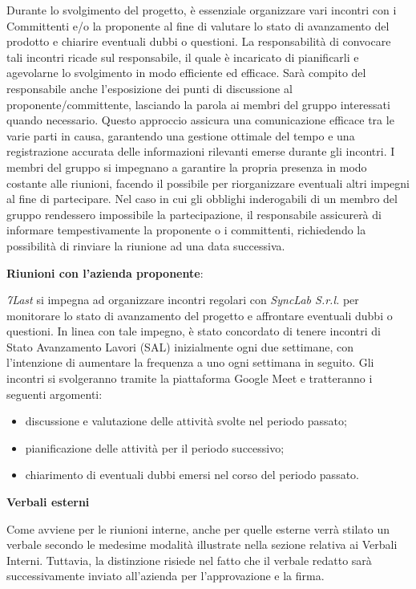 Durante lo svolgimento del progetto, è essenziale organizzare vari incontri con i Committenti e/o la proponente al fine di valutare lo stato di avanzamento del prodotto e chiarire eventuali dubbi o questioni.
La responsabilità di convocare tali incontri ricade sul responsabile, il quale è incaricato di pianificarli e agevolarne lo svolgimento in modo efficiente ed efficace.
Sarà compito del responsabile anche l’esposizione dei punti di discussione al proponente/committente, lasciando la parola ai membri del gruppo interessati quando necessario. Questo approccio assicura una comunicazione efficace tra le varie parti in causa, garantendo una gestione ottimale del tempo e una registrazione accurata delle informazioni rilevanti emerse durante gli incontri.
I membri del gruppo si impegnano a garantire la propria presenza in modo costante alle riunioni, facendo il possibile per riorganizzare eventuali altri impegni al fine di partecipare. Nel caso in cui gli obblighi inderogabili di un membro del gruppo rendessero impossibile la partecipazione, il responsabile assicurerà di informare tempestivamente la proponente o i committenti, richiedendo la possibilità di rinviare la riunione ad una data successiva.
\begin{flushleft}
\textbf{Riunioni con l'azienda proponente}:\\
\end{flushleft}
\textit{7Last} si impegna ad organizzare incontri regolari con \textit{SyncLab S.r.l.} per monitorare lo stato di avanzamento del progetto e affrontare eventuali dubbi o questioni. In linea con tale impegno, è stato concordato di tenere incontri di Stato Avanzamento Lavori (SAL) inizialmente ogni due settimane, con l'intenzione di aumentare la frequenza a uno ogni settimana in seguito. Gli incontri si svolgeranno tramite la piattaforma Google Meet e tratteranno i seguenti argomenti:
\begin{itemize}
    \item discussione e valutazione delle attività svolte nel periodo passato;
    \item pianificazione delle attività per il periodo successivo;
    \item chiarimento di eventuali dubbi emersi nel corso del periodo passato.
\end{itemize}
\begin{flushleft}
\textbf{Verbali esterni}
\end{flushleft}
Come avviene per le riunioni interne, anche per quelle esterne verrà stilato un verbale secondo le medesime modalità illustrate nella sezione relativa ai Verbali Interni. Tuttavia, la distinzione risiede nel fatto che il verbale redatto sarà successivamente inviato all'azienda per l'approvazione e la firma.

